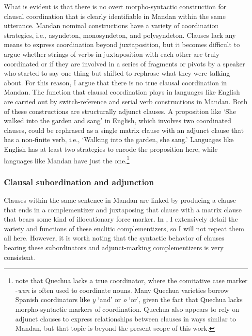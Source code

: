 What is evident is that there is no overt morpho-syntactic construction for clausal coordination that is clearly identifiable in Mandan within the same utterance. Mandan nominal constructions have a variety of coordination strategies, i.e., asyndeton, monosyndeton, and polysyndeton. Clauses lack any means to express coordination beyond juxtaposition, but it becomes difficult to argue whether strings of verbs in juxtaposition with each other are truly coordinated or if they are involved in a series of fragments or pivots by a speaker who started to say one thing but shifted to rephrase what they were talking about. For this reason, I argue that there is no true clausal coordination in Mandan. The function that clausal coordination plays in languages like English are carried out by switch-reference and serial verb constructions in Mandan. Both of these constructions are structurally adjunct clauses. A proposition like `She walked into the garden and sang' in English, which involves two coordinated clauses, could be rephrased as a single matrix clause with an adjunct clause that has a non-finite verb, i.e., `Walking into the garden, she sang.' Languages like English has at least two strategies to encode the proposition here, while languages like Mandan have just the one.\footnote{\citet[72]{lefebvremuysken1988} note that Quechua lacks a true coordinator, where the comitative case marker -\textit{wan} is often used to coordinate nouns. Many Quechua varieties borrow Spanish coordinators like \textit{y} `and' or \textit{o} `or', given the fact that Quechua lacks morpho-syntactic markers of coordination. Quechua also appears to rely on adjunct clauses to express relationships between clauses in ways similar to Mandan, but that topic is beyond the present scope of this work.}

\subsubsection{Clausal subordination and adjunction}\label{Ch5Subordination}

Clauses within the same sentence in Mandan are linked by producing a clause that ends in a complementizer and juxtaposing that clause with a matrix clause that bears some kind of illocutionary force marker. In , I extensively detail the variety and functions of these enclitic complementizers, so I will not repeat them all here. However, it is worth noting that the syntactic behavior of clauses bearing these subordinators and adjunct-marking complementizers is very consistent.

